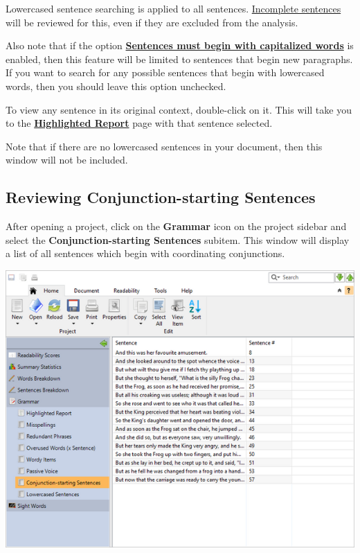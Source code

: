 \documentclass[
]{book}
\theoremstyle{definition}
\theoremstyle{definition}
\theoremstyle{definition}
\theoremstyle{definition}
\theoremstyle{remark}
\begin{document}
Lowercased sentence searching is applied to all sentences. \protect\hyperlink{how-text-is-excluded}{Incomplete sentences} will be reviewed for this, even if they are excluded from the analysis.

Also note that if the option \protect\hyperlink{options-sentence-deduction}{\textbf{Sentences must begin with capitalized words}} is enabled, then this feature will be limited to sentences that begin new paragraphs. If you want to search for any possible sentences that begin with lowercased words, then you should leave this option unchecked.

To view any sentence in its original context, double-click on it. This will take you to the \protect\hyperlink{reviewing-standard-grammar}{\textbf{Highlighted Report}} page with that sentence selected.

Note that if there are no lowercased sentences in your document, then this window will not be included.

\hypertarget{reviewing-conjunction-sentences}{%
\subsection*{Reviewing Conjunction-starting Sentences}\label{reviewing-conjunction-sentences}}

After opening a project, click on the \textbf{Grammar} icon on the project sidebar and select the \textbf{Conjunction-starting Sentences} subitem. This window will display a list of all sentences which begin with coordinating conjunctions.

\includegraphics{Images/conjunctionsent.png}
\end{document}
